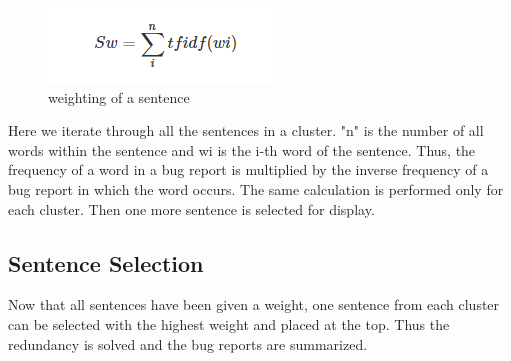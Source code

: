 \documentclass[a4paper,10pt, bibliography=totocnumbered]{scrreprt}
\begin{document}
\begin{figure}
\centering
\includegraphics[scale=0.65]{../images/Thema10_Sw.PNG}
\caption{weighting of a sentence}
\label{fig:sw}
\end{figure} 

Here we iterate through all the sentences in a cluster. "n" is the number of all words within the sentence and wi is the i-th word of the sentence. Thus, the frequency of a word in a bug report is multiplied by the inverse frequency of a bug report in which the word occurs. The same calculation is performed only for each cluster. Then one more sentence is selected for display.
\subsection{Sentence Selection}
Now that all sentences have been given a weight, one sentence from each cluster can be selected with the highest weight and placed at the top. Thus the redundancy is solved and the bug reports are summarized.
\end{document}
